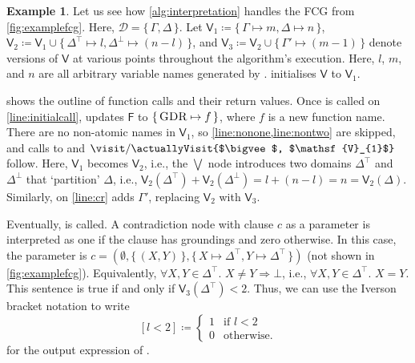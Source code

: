 \documentclass{article}
\theoremstyle{definition}
\newtheorem{example}{Example}
\newcommand{\Vone}{\mathsf{V}_{1}}
\newcommand{\Vtwo}{\mathsf{V}_{2}}
\newcommand{\Vthree}{\mathsf{V}_{3}}
\DeclareMathOperator{\CR}{\textsc{CR}}
\DeclareMathOperator{\GDR}{\textsc{GDR}}
\begin{document}
\begin{example}\label{example:interpretation}
  Let us see how \cref{alg:interpretation} handles the FCG from
  \cref{fig:examplefcg}. Here, $\mathcal{D} = \{\, \Gamma, \Delta \,\}$. Let
  $\Vone \coloneqq \{\, \Gamma \mapsto m, \Delta \mapsto n \,\}$,
  $\Vtwo \coloneqq \Vone \cup \{\, \Delta^{\top} \mapsto l, \Delta^{\bot} \mapsto (n-l) \,\}$,
  and $\Vthree \coloneqq \Vtwo \cup \{\, \Gamma' \mapsto (m-1) \,\}$ denote
  versions of $\mathsf{V}$ at various points throughout the algorithm's
  execution. Here, $l$, $m$, and $n$ are all arbitrary variable names generated
  by \newVariableName.  initialises $\mathsf{V}$ to $\Vone$.

   shows the outline of function calls and their return
  values. Once \visit{$\GDR$, $\Vone$} is called on \cref{line:initialcall},
  \newFunctionName updates $\mathsf{F}$ to $\{\, \GDR \mapsto f \,\}$, where $f$
  is a new function name. There are no non-atomic names in $\Vone$, so
  \cref{line:nonone,line:nontwo} are skipped, and calls to
  \actuallyVisit{$\GDR$, $\Vone$} and
  $\visit/\actuallyVisit{$\bigvee$, $\Vone$}$ follow. Here, $\Vone$ becomes
  $\Vtwo$, i.e., the $\bigvee$ node introduces two domains $\Delta^{\top}$ and
  $\Delta^{\bot}$ that `partition' $\Delta$, i.e.,
  $\Vtwo(\Delta^{\top}) + \Vtwo(\Delta^{\bot}) = l + (n-l) = n = \Vtwo(\Delta)$.
  Similarly, \actuallyVisit{$\CR$, $\Vtwo$} on \cref{line:cr} adds $\Gamma'$,
  replacing $\Vtwo$ with $\Vthree$.

  Eventually, \actuallyVisit{$\bot$, $\Vthree$} is called. A contradiction node
  with clause $c$ as a parameter is interpreted as one if the clause has
  groundings and zero otherwise. In this case, the parameter is
  $c = (\emptyset, \{\, (X, Y) \,\}, \{\, X \mapsto \Delta^\top, Y \mapsto \Delta^\top \,\})$
  (not shown in \cref{fig:examplefcg}). Equivalently,
  $\forall X, Y \in \Delta^{\top}\text{. }X \ne Y \Rightarrow \bot$, i.e.,
  $\forall X, Y \in \Delta^{\top}\text{. }X = Y$. This sentence is true if and
  only if $\Vthree(\Delta^{\top}) < 2$. Thus, we can use the Iverson bracket
  notation to write
  \[
    [l < 2] \coloneqq
    \begin{cases}
      1 & \text{if } l < 2 \\
      0 & \text{otherwise.}
    \end{cases}
  \]
  for the output expression of \actuallyVisit{$\bot$, $\Vthree$}.


\end{example}
\end{document}
